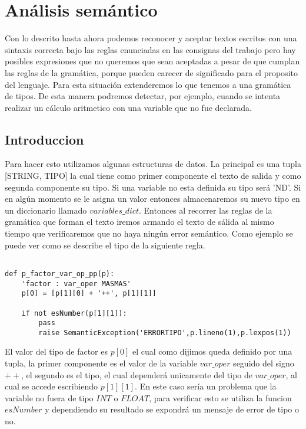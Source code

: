 \section{Análisis semántico}

Con lo descrito hasta ahora podemos reconocer y aceptar textos escritos con una sintaxis correcta bajo las reglas enunciadas en las consignas del trabajo pero hay posibles expresiones que no queremos que sean aceptadas a pesar de que cumplan las reglas de la gramática, porque pueden carecer de significado para el proposito del lenguaje. Para esta situación extenderemos lo que tenemos a una gramática de tipos. De esta manera podremos detectar, por ejemplo, cuando se intenta realizar un cálculo aritmetico con una variable que no fue declarada.


\subsection{Introduccion}

Para hacer esto utilizamos algunas estructuras de datos. La principal es una tupla [STRING, TIPO] la cual tiene como primer componente el texto de salida y como segunda componente su tipo. Si una variable no esta definida su tipo será 'ND'. Si en algún momento se le asigna un valor entonces almacenaremos su nuevo tipo en un diccionario llamado $variables\_dict$. Entonces al recorrer las reglas de la gramática que forman el texto iremos armando el texto de sálida al mismo tiempo que verificaremos que no haya ningún error semántico. Como ejemplo se puede ver como se describe el tipo de la siguiente regla.

\begin{verbatim}

def p_factor_var_op_pp(p):
    'factor : var_oper MASMAS'
    p[0] = [p[1][0] + '++', p[1][1]]

    if not esNumber(p[1][1]):
        pass
        raise SemanticException('ERRORTIPO',p.lineno(1),p.lexpos(1))

\end{verbatim}

El valor del tipo de factor es $p[0]$ el cual como dijimos queda definido por una tupla, la primer componente es el valor de la variable $var\_oper$ seguido del signo $++$, el segundo es el tipo, el cual dependerá unicamente del tipo de $var\_oper$, al cual se accede escribiendo $p[1][1]$. En este caso sería un problema que la variable no fuera de tipo $INT$ o $FLOAT$, para verificar esto se utiliza la funcion $esNumber$ y dependiendo su resultado se expondrá un mensaje de error de tipo o no.

